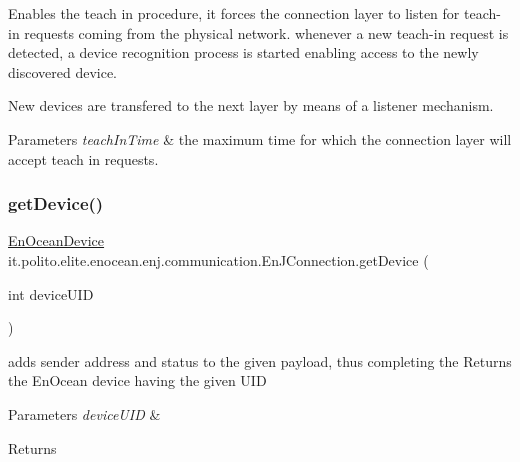 Enables the teach in procedure, it forces the connection layer to listen for teach-\/in requests coming from the physical network. whenever a new teach-\/in request is detected, a device recognition process is started enabling access to the newly discovered device. 

New devices are transfered to the next layer by means of a listener mechanism.


\begin{DoxyParams}{Parameters}
{\em teach\+In\+Time} & the maximum time for which the connection layer will accept teach in requests. \\
\hline
\end{DoxyParams}
\hypertarget{classit_1_1polito_1_1elite_1_1enocean_1_1enj_1_1communication_1_1_en_j_connection_a257b906ded59609018f129d6d62926c4}{}\label{classit_1_1polito_1_1elite_1_1enocean_1_1enj_1_1communication_1_1_en_j_connection_a257b906ded59609018f129d6d62926c4} 
\subsubsection{\texorpdfstring{get\+Device()}{getDevice()}}
{\footnotesize\ttfamily \hyperlink{classit_1_1polito_1_1elite_1_1enocean_1_1enj_1_1model_1_1_en_ocean_device}{En\+Ocean\+Device} it.\+polito.\+elite.\+enocean.\+enj.\+communication.\+En\+J\+Connection.\+get\+Device (\begin{DoxyParamCaption}\item[{int}]{device\+U\+ID }\end{DoxyParamCaption})}

adds sender address and status to the given payload, thus completing the Returns the En\+Ocean device having the given U\+ID


\begin{DoxyParams}{Parameters}
{\em device\+U\+ID} & \\
\hline
\end{DoxyParams}
\begin{DoxyReturn}{Returns}

\end{DoxyReturn}
\hypertarget{classit_1_1polito_1_1elite_1_1enocean_1_1enj_1_1communication_1_1_en_j_connection_a95fb186c70d14dc35c629322763d12d3}{}\label{classit_1_1polito_1_1elite_1_1enocean_1_1enj_1_1communication_1_1_en_j_connection_a95fb186c70d14dc35c629322763d12d3} 
